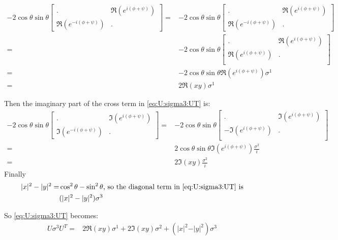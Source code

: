 \documentclass[]{article}
\begin{document}
\begin{align*}
	-2 \cos{\theta}\sin{\theta}\begin{bmatrix}
		.&\Re({e^{i(\phi + \psi)}})\\
		\Re({e^{-i(\phi + \psi)}})&.
	\end{bmatrix}=&	-2 \cos{\theta}\sin{\theta} \begin{bmatrix}
		.&\Re({e^{i(\phi + \psi)}})\\
		\Re({e^{-i(\phi + \psi)}})&.
	\end{bmatrix}\\
	=&	-2 \cos{\theta}\sin{\theta} \begin{bmatrix}
		.&\Re({e^{i(\phi + \psi)}})\\
		\Re({e^{i(\phi + \psi)}})&.\\
	\end{bmatrix} \\
	=& -2 \cos{\theta}\sin{\theta} \Re({e^{i(\phi + \psi)}}) \sigma^1\\
	=& 2 \Re(xy) \sigma^1
\end{align*}

Then the imaginary part of the cross term in \eqref{eq:U:sigma3:UT} is:
\begin{align*}
	-2 \cos{\theta}\sin{\theta}\begin{bmatrix}
		.&\Im({e^{i(\phi + \psi)}})\\
		\Im({e^{-i(\phi + \psi)}})&.
	\end{bmatrix}=&	-2 \cos{\theta}\sin{\theta} \begin{bmatrix}
		.&\Im({e^{i(\phi + \psi)}})\\
		-\Im({e^{i(\phi + \psi)}})&.\\
	\end{bmatrix} \\
	=& 2 \cos{\theta}\sin{\theta} \Im({e^{i(\phi + \psi)}}) \frac{\sigma^2}{i}\\
	=& 2 \Im(xy) \frac{\sigma^2}{i}
\end{align*}
Finally
\begin{align*}
	\vert x \vert^2 - \vert y \vert^2 =& \cos^2 \theta - \sin^2 \theta \text{, so the diagonal term in \eqref{eq:U:sigma3:UT} is}\\
	&(\vert x \vert^2 - \vert y \vert^2) \sigma^3
\end{align*}

So \eqref{eq:U:sigma3:UT} becomes:
\begin{align*}
		U \sigma^3 U^T =&  2 \Re(xy) \sigma^1 + 2 \Im(xy) \sigma^2 + (\vert x \vert^2 - \vert y \vert^2) \sigma^3
\end{align*}


\raggedright

\end{document}
